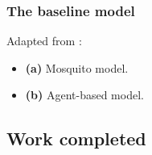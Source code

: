 \documentclass[8pt]{beamer}
\begin{document}
\begin{frame}
\frametitle{The baseline model}

Adapted from \textcite{manore_network-patch_2015}:


%
\vspace{-.4cm}
\begin{itemize}
    \item \textbf{(a)} Mosquito model.
    \item \textbf{(b)} Agent-based model.
\end{itemize}

\end{frame}







\subsection{Work completed}
\end{document}

